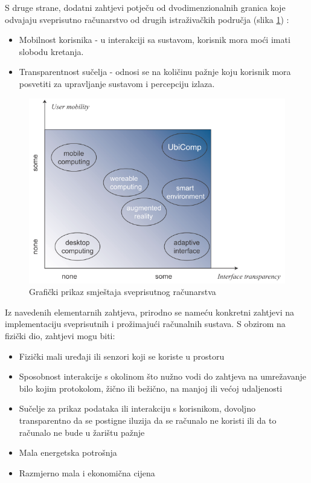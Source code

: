 \documentclass[times, utf8, diplomski, numeric]{fer}
\begin{document}
S druge strane, dodatni zahtjevi potječu od dvodimenzionalnih granica koje
odvajaju sveprisutno računarstvo od drugih istraživačkih područja (slika
\ref{fig:ubiqreq}) \cite{Maffioletti2001}:
\begin{itemize}
  \item Mobilnost korisnika - u interakciji sa sustavom, korisnik mora moći
  imati slobodu kretanja.
  \item Transparentnost sučelja - odnosi se na količinu pažnje koju korisnik
  mora posvetiti za upravljanje sustavom i percepciju izlaza.
\end{itemize}

\begin{figure}[H]
	\centering
	\includegraphics[width=12cm]{images/ubiqreq.png}
	\caption{Grafički prikaz smještaja sveprisutnog računarstva}
	\label{fig:ubiqreq}
\end{figure}

Iz navedenih elementarnih zahtjeva, prirodno se nameću konkretni zahtjevi na
implementaciju sveprisutnih i prožimajući računalnih sustava. S obzirom na
fizički dio, zahtjevi mogu biti:
\begin{itemize}
  \item Fizički mali uređaji ili senzori koji se koriste u prostoru
  \item Sposobnost interakcije s okolinom što nužno vodi do zahtjeva
  na umrežavanje bilo kojim protokolom, žično ili bežično, na manjoj ili većoj
  udaljenosti
  \item Sučelje za prikaz podataka ili interakciju s korisnikom, dovoljno
  transparentno da se postigne iluzija da se računalo ne koristi ili da to
  računalo ne bude u žarištu pažnje
  \item Mala energetska potrošnja
  \item Razmjerno mala i ekonomična cijena
\end{itemize}
\end{document}
